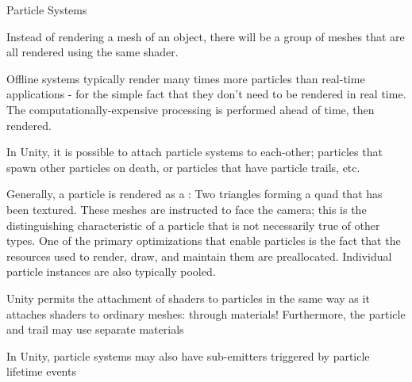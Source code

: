 \documentclass[11pt]{article}
\begin{document}
\begin{topic}{Particle Systems}
	\item Instead of rendering a mesh of an object, there will be a group of  meshes that are all rendered using the same shader.
	\item Offline systems typically render many times more particles than real-time applications - for the simple fact that they don't need to be rendered in real time. The computationally-expensive processing is performed ahead of time, then rendered.
	\item In Unity, it is possible to attach particle systems to each-other; particles that spawn other particles on death, or particles that have particle trails, etc.
	\item Generally, a particle is rendered as a : Two triangles forming a quad that has been textured. These  meshes are instructed to face the camera; this is the distinguishing characteristic of a  particle that is not necessarily true of other types.
	\term One of the primary optimizations that enable particles is the fact that the resources used to render, draw, and maintain them are preallocated. Individual particle instances are also typically pooled.
	\item Unity permits the attachment of shaders to particles in the same way as it attaches shaders to ordinary meshes: through materials! Furthermore, the particle and trail may use separate materials
	\item In Unity, particle systems may also have sub-emitters triggered by particle lifetime events
\end{topic}
\end{document}
